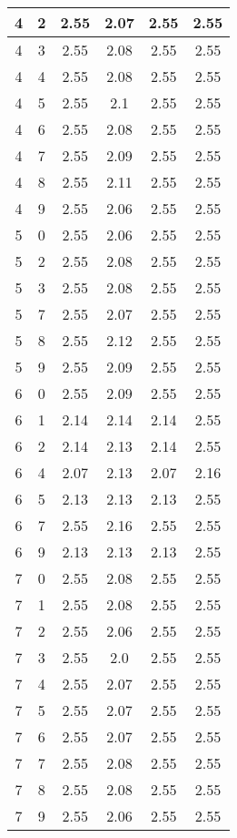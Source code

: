 \begin{longtable}{|c|c||c||c||c|c|}
	4 & 2 & 2.55 & 2.07 & 2.55 & 2.55 \\ \hline
	4 & 3 & 2.55 & 2.08 & 2.55 & 2.55 \\ \hline
	4 & 4 & 2.55 & 2.08 & 2.55 & 2.55 \\ \hline
	4 & 5 & 2.55 & 2.1 & 2.55 & 2.55 \\ \hline
	4 & 6 & 2.55 & 2.08 & 2.55 & 2.55 \\ \hline
	4 & 7 & 2.55 & 2.09 & 2.55 & 2.55 \\ \hline
	4 & 8 & 2.55 & 2.11 & 2.55 & 2.55 \\ \hline
	4 & 9 & 2.55 & 2.06 & 2.55 & 2.55 \\ \hline
	5 & 0 & 2.55 & 2.06 & 2.55 & 2.55 \\ \hline
	5 & 2 & 2.55 & 2.08 & 2.55 & 2.55 \\ \hline
	5 & 3 & 2.55 & 2.08 & 2.55 & 2.55 \\ \hline
	5 & 7 & 2.55 & 2.07 & 2.55 & 2.55 \\ \hline
	5 & 8 & 2.55 & 2.12 & 2.55 & 2.55 \\ \hline
	5 & 9 & 2.55 & 2.09 & 2.55 & 2.55 \\ \hline
	6 & 0 & 2.55 & 2.09 & 2.55 & 2.55 \\ \hline
	6 & 1 & 2.14 & 2.14 & 2.14 & 2.55 \\ \hline
	6 & 2 & 2.14 & 2.13 & 2.14 & 2.55 \\ \hline
	6 & 4 & 2.07 & 2.13 & 2.07 & 2.16 \\ \hline
	6 & 5 & 2.13 & 2.13 & 2.13 & 2.55 \\ \hline
	6 & 7 & 2.55 & 2.16 & 2.55 & 2.55 \\ \hline
	6 & 9 & 2.13 & 2.13 & 2.13 & 2.55 \\ \hline
	7 & 0 & 2.55 & 2.08 & 2.55 & 2.55 \\ \hline
	7 & 1 & 2.55 & 2.08 & 2.55 & 2.55 \\ \hline
	7 & 2 & 2.55 & 2.06 & 2.55 & 2.55 \\ \hline
	7 & 3 & 2.55 & 2.0 & 2.55 & 2.55 \\ \hline
	7 & 4 & 2.55 & 2.07 & 2.55 & 2.55 \\ \hline
	7 & 5 & 2.55 & 2.07 & 2.55 & 2.55 \\ \hline
	7 & 6 & 2.55 & 2.07 & 2.55 & 2.55 \\ \hline
	7 & 7 & 2.55 & 2.08 & 2.55 & 2.55 \\ \hline
	7 & 8 & 2.55 & 2.08 & 2.55 & 2.55 \\ \hline
	7 & 9 & 2.55 & 2.06 & 2.55 & 2.55 \\ \hline
\end{longtable}
